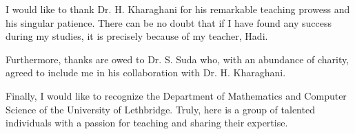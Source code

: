 \documentclass[../../main]{subfiles}
\begin{document}
 I would like to thank Dr. H. Kharaghani for his remarkable teaching prowess and his singular patience. There can be no doubt that if I have found any success during my studies, it is precisely because of my teacher, Hadi. 
 
 Furthermore, thanks are owed to Dr. S. Suda who, with an abundance of charity, agreed to include me in his collaboration with Dr. H. Kharaghani.
 
 Finally, I would like to recognize the Department of Mathematics and Computer Science of the University of Lethbridge. Truly, here is a group of talented individuals with a passion for teaching and sharing their expertise.
\end{document}
